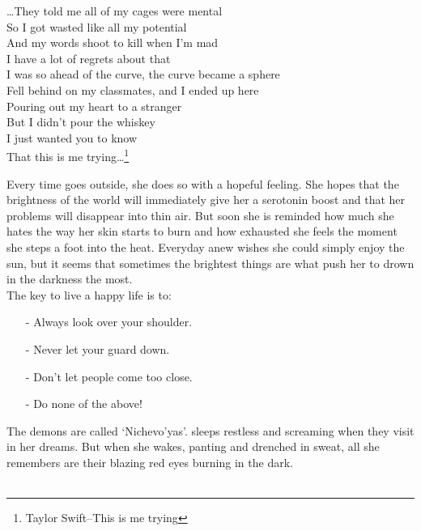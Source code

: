 \documentclass{article}
\begin{document}
\begin{Center}
    \ttfamily\label{this is me trying}\ldots They told me all of my cages were mental\\So I got wasted like all my potential\\And my words shoot to kill when I'm mad\\I have a lot of regrets about that\\I was so ahead of the curve, the curve became a sphere\\Fell behind on my classmates, and I ended up here\\Pouring out my heart to a stranger\\But I didn't pour the whiskey\\I just wanted you to know\\That this is me trying\ldots\footnote{Taylor Swift--This is me trying}\rmfamily\\[1cm]
\end{Center}

Every time \TheWriter{} goes outside, she does so with a hopeful feeling. She hopes that the brightness of the world will immediately give her a serotonin boost and that her problems will disappear into thin air. But soon she is reminded how much she hates the way her skin starts to burn and how exhausted she feels the moment she steps a foot into the heat. Everyday anew \TheWriter{} wishes she could simply enjoy the sun, but it seems that sometimes the brightest things are what push her to drown in the darkness the most.\\[1cm]

The key to live a happy life is to:
\begin{itemize}
    \item[-]Always look over your shoulder.
    \item[-]Never let your guard down.
    \item[-]Don't let people come too close.
    \item[-]Do none of the above!
\end{itemize} \newpage

The demons are called \enquote*{Nichevo'yas}. \TheWriter{} sleeps restless and screaming when they visit in her dreams. But when she wakes, panting and drenched in sweat, all she remembers are their blazing red eyes burning in the dark.\\[1cm]

\color[Gray]{7}\color{black}\\[1cm]
\end{document}
